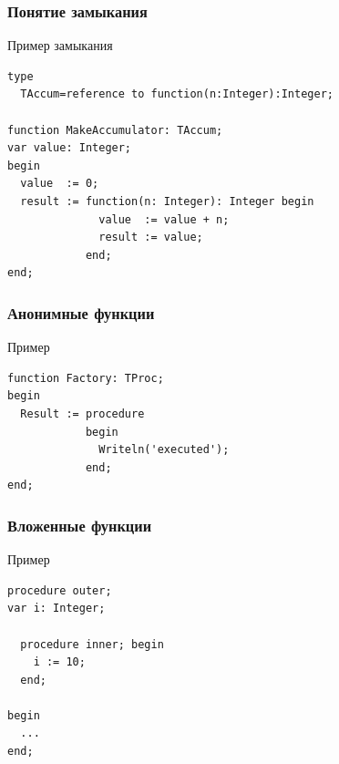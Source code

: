 \documentclass[roman,12pt]{beamer}
\begin{document}
\begin{frame}[fragile]
  \frametitle{Понятие замыкания}
  

\begin{block}{Пример замыкания}

\begin{lstlisting}
type
  TAccum=reference to function(n:Integer):Integer;

function MakeAccumulator: TAccum;
var value: Integer;
begin
  value  := 0;
  result := function(n: Integer): Integer begin
              value  := value + n;
              result := value;
            end;
end;
\end{lstlisting}


\end{block}

  
\end{frame}

\begin{frame}[fragile]
  \frametitle{Анонимные функции}
  \begin{block}{Пример}
\begin{lstlisting}
function Factory: TProc;
begin
  Result := procedure
            begin
              Writeln('executed');
            end;
end;
\end{lstlisting}

  \end{block} 
\end{frame}

\begin{frame}[fragile]
  \frametitle{Вложенные функции}
  
  \begin{block}{Пример}
\begin{lstlisting}    
procedure outer;
var i: Integer;

  procedure inner; begin
    i := 10;
  end;

begin
  ...
end;    
\end{lstlisting}
  \end{block} 

\end{frame}
\end{document}
